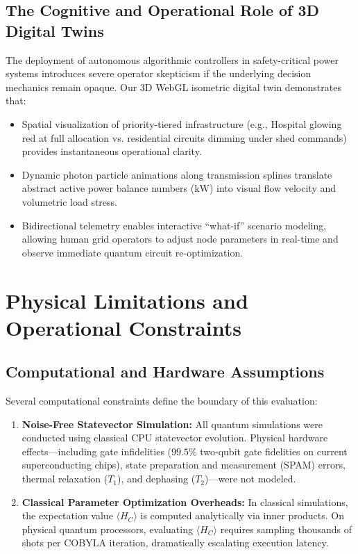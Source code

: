 \documentclass[11pt,a4paper]{article}
\theoremstyle{definition}
\theoremstyle{remark}
\begin{document}
\subsection{The Cognitive and Operational Role of 3D Digital Twins}
The deployment of autonomous algorithmic controllers in safety-critical power systems introduces severe operator skepticism if the underlying decision mechanics remain opaque. Our 3D WebGL isometric digital twin demonstrates that:
\begin{itemize}
    \item Spatial visualization of priority-tiered infrastructure (e.g., Hospital glowing red at full allocation vs. residential circuits dimming under shed commands) provides instantaneous operational clarity.
    \item Dynamic photon particle animations along transmission splines translate abstract active power balance numbers ($\text{kW}$) into visual flow velocity and volumetric load stress.
    \item Bidirectional telemetry enables interactive ``what-if'' scenario modeling, allowing human grid operators to adjust node parameters in real-time and observe immediate quantum circuit re-optimization.
\end{itemize}

\section{Physical Limitations and Operational Constraints}
\label{sec:limitations}

\subsection{Computational and Hardware Assumptions}
Several computational constraints define the boundary of this evaluation:
\begin{enumerate}
    \item \textbf{Noise-Free Statevector Simulation:} All quantum simulations were conducted using classical CPU statevector evolution. Physical hardware effects---including gate infidelities ($99.5\%$ two-qubit gate fidelities on current superconducting chips), state preparation and measurement (SPAM) errors, thermal relaxation ($T_1$), and dephasing ($T_2$)---were not modeled.
    \item \textbf{Classical Parameter Optimization Overheads:} In classical simulations, the expectation value $\langle H_C \rangle$ is computed analytically via inner products. On physical quantum processors, evaluating $\langle H_C \rangle$ requires sampling thousands of shots per COBYLA iteration, dramatically escalating execution latency.
\end{enumerate}
\end{document}
